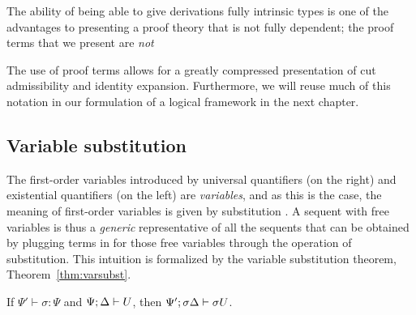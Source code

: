 The ability of being able to give derivations fully intrinsic types
is one of the advantages to presenting a proof theory that is not
fully dependent; the proof terms that we present are {\it not} 


The use of proof terms allows for a greatly compressed presentation of
cut admissibility and identity expansion. Furthermore, we will reuse
much of this notation in our formulation of a logical framework in the
next chapter. 

\subsection{Variable substitution}

The first-order variables introduced by universal quantifiers (on the
right) and existential quantifiers (on the left) are {\it variables},
and as this is the case, the meaning of first-order variables is given
by substitution \cite[Chapter 1]{harper12practical}. A sequent with
free variables is thus a {\it generic} representative of all the
sequents that can be obtained by plugging terms in for those free
variables through the operation of substitution. This intuition is
formalized by the variable substitution theorem,
Theorem~\ref{thm:varsubst}.

\bigskip
\begin{theorem}
\label{thm:varsubst}
If $\Psi' \vdash \sigma : \Psi$ and ${\Psi};{\Delta} \vdash {U}$, then 
${\Psi'};{\sigma\Delta} \vdash {\sigma{U}}$.
\end{theorem}

